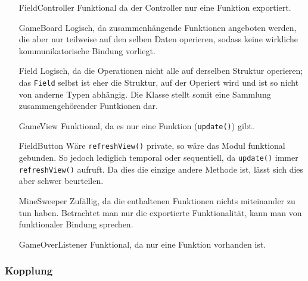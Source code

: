 \documentclass{scrartcl}
\begin{document}
\begin{itemize}[font=\ttfamily,leftmargin=2cm,align=left]
   \item[FieldController] Funktional da der Controller nur eine Funktion
      exportiert.
   \item[GameBoard] Logisch, da zusammenhängende Funktionen angeboten werden,
      die aber nur teilweise auf den selben Daten operieren, sodass keine
      wirkliche kommunikatorische Bindung vorliegt.
   \item[Field] Logisch, da die Operationen nicht alle auf derselben Struktur
      operieren; das \texttt{Field} selbst ist eher die Struktur, auf der
      Operiert wird und ist so nicht von anderne Typen abhängig. Die Klasse
      stellt somit eine Sammlung zusammengehörender Funtkionen dar.
   \item[GameView] Funktional, da es nur eine Funktion (\texttt{update()}) gibt.
   \item[FieldButton] Wäre \texttt{refreshView()} private, so wäre das Modul
      funktional gebunden. So jedoch lediglich temporal oder sequentiell, da
      \texttt{update()} immer \texttt{refreshView()} aufruft. Da dies die
      einzige andere Methode ist, lässt sich dies aber schwer beurteilen.
   \item[MineSweeper] Zufällig, da die enthaltenen Funktionen nichts miteinander
      zu tun haben. Betrachtet man nur die exportierte Funktionalität, kann man
      von funktionaler Bindung sprechen.
   \item[GameOverListener] Funktional, da nur eine Funktion vorhanden ist.
\end{itemize}

\subsubsection{Kopplung}
\end{document}
